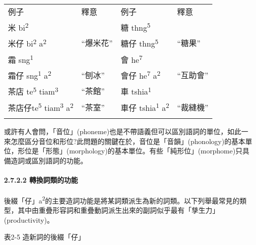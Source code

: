 \tabletail{}
\tablelasttail{}
\begin{tabularx}{\textwidth}{XXXX}
\lsptoprule

 例子 & 釋意 & 例子 & 釋意\\
{\sffamily \textrm{米 bi}\textrm{\textsuperscript{2}}} &  & {\sffamily \textrm{糖 thng}\textrm{\textsuperscript{5}}} & \\
{\sffamily \textrm{米仔 bi}\textrm{\textsuperscript{2}} \textrm{a}\textrm{\textsuperscript{2}}} & ``爆米花'' & {\sffamily \textrm{糖仔 thng}\textrm{\textsuperscript{5}}} & ``糖果''\\
{\sffamily \textrm{霜 sng}\textrm{\textsuperscript{1}}} &  & {\sffamily \textrm{會 he}\textrm{\textsuperscript{7}}} & \\
{\sffamily \textrm{霜仔 sng}\textrm{\textsuperscript{1}} \textrm{a}\textrm{\textsuperscript{2}}} & ``刨冰'' & {\sffamily \textrm{會仔 he}\textrm{\textsuperscript{7}} \textrm{a}\textrm{\textsuperscript{2}}} & ``互助會''\\
{\sffamily \textrm{茶店 te}\textrm{\textsuperscript{5}} \textrm{tiam}\textrm{\textsuperscript{3}}} & ``茶館'' & {\sffamily \textrm{車 tshia}\textrm{\textsuperscript{1}}} & \\
{\sffamily \textrm{茶店仔te}\textrm{\textsuperscript{5}} \textrm{tiam}\textrm{\textsuperscript{3}} \textrm{a}\textrm{\textsuperscript{2}}} & ``茶室'' & {\sffamily \textrm{車仔 tshia}\textrm{\textsuperscript{1}} \textrm{a}\textrm{\textsuperscript{2}}} & ``裁縫機''\\
\lspbottomrule
\end{tabularx}
\textrm{或許有人會問，「音位」(phoneme)也是不帶語義但可以區別語詞的單位，如此一來怎麼區分音位和形位?此問題的關鍵在於，音位是「音韻」(phonology)的基本單位，形位是「形態」(morphology)的基本單位。有些「純形位」(morphome)只具備造詞或區別語詞的功能。}

\paragraph{2.7.2.2 轉換詞類的功能}

\textrm{後綴「仔」a}\textrm{\textsuperscript{2}}\textrm{的主要造詞功能是將某詞類派生為新的詞類。以下列舉最常見的類型，其中由重疊形容詞和重疊動詞派生出來的副詞似乎最有「孳生力」(productivity)}。

\rmfamily
表2-5 造新詞的後綴「仔」

\tablefirsthead{}

